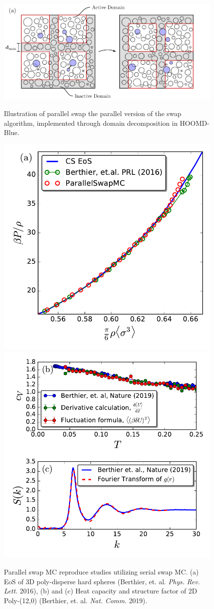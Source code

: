 \begin{frame}
\begin{columns}
\begin{column}{0.6\textwidth}
\begin{figure}
\begin{overprint}
\centering\includegraphics[width=\textwidth]{backup-simulationdetails/ParallelSwapMC_Illustration(3).pdf}\caption{Illustration of parallel swap the parallel version of the swap algorithm, implemented through domain decomposition in HOOMD-Blue.} 

\centering\includegraphics[width=0.48\linewidth]{backup-simulationdetails/3dpolydisperse.pdf}
\centering\includegraphics[width=0.48\linewidth]{backup-simulationdetails/2dbenchmark.pdf}
\caption{Parallel swap MC reproduce studies utilizing serial swap MC. (a) EoS of 3D poly-disperse hard spheres (Berthier, et. al. \textit{Phys. Rev. Lett.} 2016), (b) and (c) Heat capacity and structure factor of 2D Poly-(12,0) (Berthier, et. al. \textit{Nat. Comm.} 2019).} 
\end{overprint}


\end{figure}
\end{column}
\end{columns}
\end{frame}
